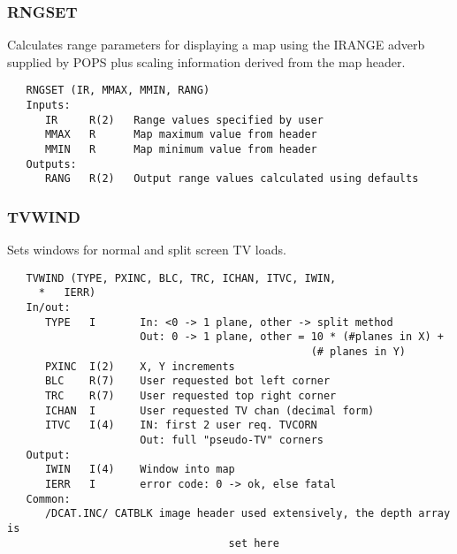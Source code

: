 \subsubsection{RNGSET}
Calculates range parameters for displaying a map using the
IRANGE adverb supplied by POPS plus scaling information derived
from the map header.
\begin{verbatim}
   RNGSET (IR, MMAX, MMIN, RANG)
   Inputs:
      IR     R(2)   Range values specified by user
      MMAX   R      Map maximum value from header
      MMIN   R      Map minimum value from header
   Outputs:
      RANG   R(2)   Output range values calculated using defaults
\end{verbatim}

\subsubsection{TVWIND}
Sets windows for normal and split screen TV loads.
\begin{verbatim}
   TVWIND (TYPE, PXINC, BLC, TRC, ICHAN, ITVC, IWIN,
     *   IERR)
   In/out:
      TYPE   I       In: <0 -> 1 plane, other -> split method
                     Out: 0 -> 1 plane, other = 10 * (#planes in X) +
                                                (# planes in Y)
      PXINC  I(2)    X, Y increments
      BLC    R(7)    User requested bot left corner
      TRC    R(7)    User requested top right corner
      ICHAN  I       User requested TV chan (decimal form)
      ITVC   I(4)    IN: first 2 user req. TVCORN
                     Out: full "pseudo-TV" corners
   Output:
      IWIN   I(4)    Window into map
      IERR   I       error code: 0 -> ok, else fatal
   Common:
      /DCAT.INC/ CATBLK image header used extensively, the depth array is
                                   set here
\end{verbatim}
